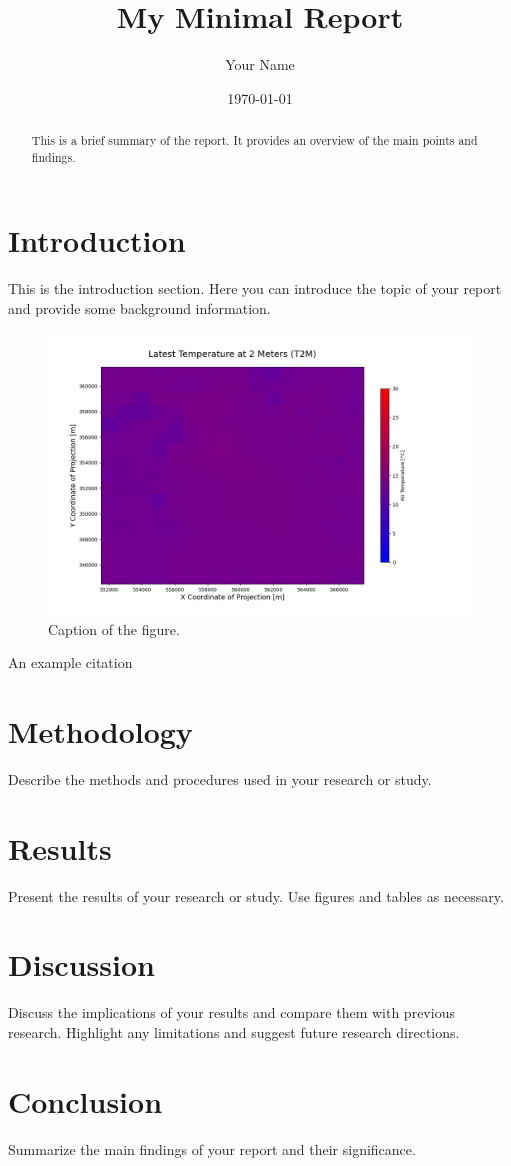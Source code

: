 \documentclass[a4paper, 12pt]{report}
\title{My Minimal Report}
\author{Your Name}
\date{\today}
\begin{document}
\maketitle

\begin{abstract}
This is a brief summary of the report. It provides an overview of the main points and findings.
\end{abstract}

\chapter{Introduction}
This is the introduction section. Here you can introduce the topic of your report and provide some background information.

\begin{figure}[htbp]
    \centering
    \includegraphics[width=1.0\textwidth]{../figures/graz_latest_t2m.png}
    \caption{Caption of the figure.}
    \label{fig:examplebook}
\end{figure}

An example citation \cite{examplebook}

\chapter{Methodology}
Describe the methods and procedures used in your research or study.

\chapter{Results}
Present the results of your research or study. Use figures and tables as necessary.

\chapter{Discussion}
Discuss the implications of your results and compare them with previous research. Highlight any limitations and suggest future research directions.

\chapter{Conclusion}
Summarize the main findings of your report and their significance.

\printbibliography
\end{document}
